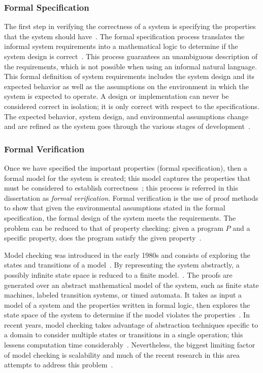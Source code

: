 \subsubsection{Formal Specification}
\label{sec:formalSpec}
The first step in verifying the correctness of a system is specifying the properties that the system should have~\cite{clarke2018model}. The formal specification process translates the informal system requirements into a mathematical logic to determine if the system design is correct~\cite{hinchey2012industrial}. This process guarantees an unambiguous description of the requirements, which is not possible when using an informal natural language. This formal definition of system requirements includes the system design and its expected behavior as well as the assumptions on the environment in which the system is expected to operate. A design or implementation can never be considered correct in isolation; it is only correct with respect to the specifications. The expected behavior, system design, and environmental assumptions change and are refined as the system goes through the various stages of development~\cite{lamsweerde2000formal}. 

\subsubsection{Formal Verification} 
\label{sec:formalVer}
Once we have specified the important properties (formal specification), then a formal model for the system is created; this model captures the properties that must be considered to establish correctness~\cite{clarke2018model}; this process is referred in this dissertation as \emph{formal verification}. Formal verification is the use of proof methods to show that given the environmental assumptions stated in the formal specification, the formal design of the system meets the requirements. The problem can be reduced to that of property checking: given a program $P$ and a specific property, does the program satisfy the given property~\cite{fitting2012first}.  

Model checking was introduced in the early 1980s and consists of exploring the states and transitions of a model~\cite{clarke1981design,queille1982specification}. By representing the system abstractly, a possibly infinite state space is reduced to a finite model.~\cite{d2008survey}. The proofs are generated over an abstract mathematical model of the system, such as finite state machines, labeled transition systems, or timed automata. It takes as input a model of a system and the properties written in formal logic, then explores the state space of the system to determine if the model violates the properties~\cite{clarke2018model,fraser2009testing}. In recent years, model checking takes advantage of abstraction techniques specific to a domain to consider multiple states or transitions in a single operation; this lessens computation time considerably~\cite{d2008survey}. Nevertheless, the biggest limiting factor of model checking is scalability and much of the recent research in this area attempts to address this problem~\cite{clarke2018model}.

